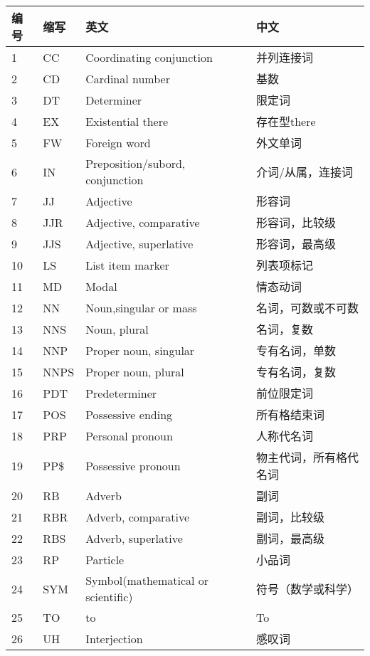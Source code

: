 \begin{longtable}{| p{.05\linewidth} | p{.05\linewidth} | p{.35\linewidth} | p{.30\linewidth} |}
\hline
\rowcolor{SeaGreen3!30!} \textbf{编号} & \textbf{缩写} & \textbf{英文} & \textbf{中文} \\ \hline
1 & CC & Coordinating conjunction & 并列连接词 \\ \hline
2 & CD & Cardinal number & 基数 \\ \hline
3 & DT & Determiner & 限定词 \\ \hline
4 & EX & Existential there & 存在型there \\ \hline
5 & FW & Foreign word & 外文单词 \\ \hline
6 & IN & Preposition/subord, conjunction & 介词/从属，连接词 \\ \hline
7 & JJ & Adjective & 形容词 \\ \hline
8 & JJR & Adjective, comparative & 形容词，比较级 \\ \hline
9 & JJS & Adjective, superlative & 形容词，最高级 \\ \hline
10 & LS & List item marker & 列表项标记 \\ \hline
11 & MD & Modal & 情态动词 \\ \hline
12 & NN & Noun,singular or mass & 名词，可数或不可数 \\ \hline
13 & NNS & Noun, plural & 名词，复数 \\ \hline
14 & NNP & Proper noun, singular & 专有名词，单数 \\ \hline
15 & NNPS & Proper noun, plural & 专有名词，复数 \\ \hline
16 & PDT & Predeterminer & 前位限定词 \\ \hline
17 & POS & Possessive ending & 所有格结束词 \\ \hline
18 & PRP & Personal pronoun & 人称代名词 \\ \hline
19 & PP\$ & Possessive pronoun & 物主代词，所有格代名词 \\ \hline
20 & RB & Adverb & 副词 \\ \hline
21 & RBR & Adverb, comparative & 副词，比较级 \\ \hline
22 & RBS & Adverb, superlative & 副词，最高级 \\ \hline
23 & RP & Particle & 小品词 \\ \hline
24 & SYM & Symbol(mathematical or scientific) & 符号（数学或科学） \\ \hline
25 & TO & to & To \\ \hline
26 & UH & Interjection & 感叹词 \\ \hline

\end{longtable}
